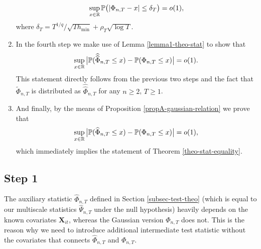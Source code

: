 \documentclass[a4paper,12pt]{article}
\newcommand{\doublehattwo}[1]{\widehat{\widehat{#1}}}
\begin{document}
\begin{enumerate}
\begin{align*}
\sup_{x \in \mathbb{R}} \mathbb{P} \big( | \Phi_{n,T} - x | \le \delta_T \big) = o(1),
\end{align*}
where $\delta_T = T^{1/q} / \sqrt{T h_{\min}} + \rho_T \sqrt{\log T}$.
\item In the fourth step we make use of Lemma \ref{lemma1-theo-stat} to show that
\begin{equation*}
\sup_{x \in \reals} \big| \pr(\doublehattwo{\Phi}_{n, T} \le x) - \pr(\Phi_{n,T} \le x) \big| = o(1). 
\end{equation*}
This statement directly follows from the previous two steps and the fact that $\widetilde{\Phi}_{n, T}$ is distributed as $\doublehattwo{\Phi}_{n, T}$ for any $n \ge 2$, $T \ge 1$.
\item And finally, by the means of Proposition \ref{propA-gaussian-relation} we prove that  
\begin{equation*}
\sup_{x \in \mathbb{R}} \big| \mathbb{P}(\widehat{\Phi}_{n, T} \le x) - \mathbb{P}(\Phi_{n,T} \le x) \big| = o(1),
\end{equation*}
which immediately implies the statement of Theorem \ref{theo-stat-equality}.
\end{enumerate}

\subsection*{Step 1}

The auxiliary statistic $\widehat{\Phi}_{n,T}$ defined in Section \ref{subsec-test-theo} (which is equal to our multiscale statistics $\widehat{\Psi}_{n,T}$ under the null hypothesis) heavily depends on the known covariates $\mathbf{X}_{it}$, whereas the Gaussian version $\Phi_{n,T}$ does not. This is the reason why we need to introduce additional intermediate test statistic without the covariates that connects $\widehat{\Phi}_{n,T}$ and $\Phi_{n,T}$. 
\end{document}
